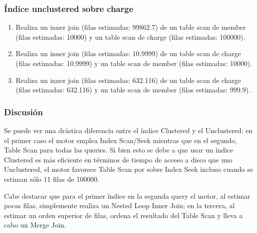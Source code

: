 \subsubsection{Índice unclustered sobre charge}
\begin{enumerate}[label=(\alph*)]
  \item Realiza un inner join (filas estimadas: 99862.7) de un table scan de member (filas estimadas: 10000) y un table scan de charge (filas estimadas: 100000).
  \item Realiza un inner join (filas estimadas: 10.9999) de un table scan de charge (filas estimadas: 10.9999) y un table scan de member (filas estimadas: 10000).
  \item Realiza un inner join (filas estimadas: 632.116) de un table scan de charge (filas estimadas: 632.116) y un table scan de member (filas estimadas: 999.9).
\end{enumerate}

\subsubsection{Discusión}
\par Se puede ver una drástica diferencia entre el índice Clustered y el Unclustered: en el primer caso el motor emplea Index Scan/Seek mientras que en el segundo, Table Scan para todas las queries. 
Si bien esto se debe a que usar un índice Clustered es más eficiente en términos de tiempo de acceso a disco que uno Unclustered,  el motor favorece Table Scan por sobre Index Seek incluso cuando se estiman sólo 11 filas de 100000.
\par Cabe destacar que para el primer índice en la segunda query el motor, al estimar pocas filas, simplemente realiza un Nested Loop Inner Join; en la tercera, al estimar un orden superior de filas, ordena el resultado del Table Scan y lleva a cabo un Merge Join.
